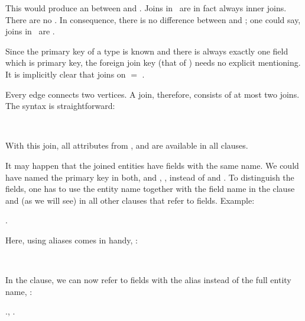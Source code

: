 This would produce an  
between  and .
Joins in \nowdb\ are in fact always inner joins.
There are no . 
In consequence, there is no difference between
 and ; one could say,
joins in \nowdb\ are .

Since the primary key of a type is known
and there is always exactly one field
which is primary key, the foreign join key
(that of ) needs no
explicit mentioning. It is implicitly clear 
that   
joins on  $=$ .

Every edge connects two vertices.
A join, therefore, consists of at most two joins.
The syntax is straightforward:

 
    \\
\hspace*{2cm}   

With this join, all attributes
from ,  and 
are available in all clauses.

It may happen that the joined entities
have fields with the same name.
We could have named the primary key in both,
 and ,
, instead of
 and .
To distinguish the fields,
one has to use the entity name together with the field name
in the  clause and (as we will see) in all
other clauses that refer to fields.
Example:

 .

Here, using aliases comes in handy, \eg:

   
    
                 \\
\hspace*{2.8cm}   
                               

In the  clause, we can now refer to fields
with the alias instead of the full entity name, \eg:

 .,
                 .

